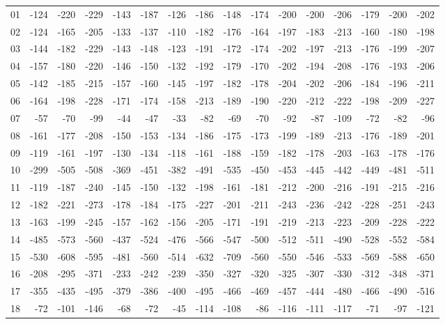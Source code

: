 \begin{longtable}{lrrrrrrrrrrrrrrr}
01 & -124 & -220 & -229 & -143 & -187 & -126 & -186 & -148 & -174 & -200 & -200 & -206 & -179 & -200 & -202 \\
02 & -124 & -165 & -205 & -133 & -137 & -110 & -182 & -176 & -164 & -197 & -183 & -213 & -160 & -180 & -198 \\
03 & -144 & -182 & -229 & -143 & -148 & -123 & -191 & -172 & -174 & -202 & -197 & -213 & -176 & -199 & -207 \\
04 & -157 & -180 & -220 & -146 & -150 & -132 & -192 & -179 & -170 & -202 & -194 & -208 & -176 & -193 & -206 \\
05 & -142 & -185 & -215 & -157 & -160 & -145 & -197 & -182 & -178 & -204 & -202 & -206 & -184 & -196 & -211 \\
06 & -164 & -198 & -228 & -171 & -174 & -158 & -213 & -189 & -190 & -220 & -212 & -222 & -198 & -209 & -227 \\
07 & -57 & -70 & -99 & -44 & -47 & -33 & -82 & -69 & -70 & -92 & -87 & -109 & -72 & -82 & -96 \\
08 & -161 & -177 & -208 & -150 & -153 & -134 & -186 & -175 & -173 & -199 & -189 & -213 & -176 & -189 & -201 \\
09 & -119 & -161 & -197 & -130 & -134 & -118 & -161 & -188 & -159 & -182 & -178 & -203 & -163 & -178 & -176 \\
10 & -299 & -505 & -508 & -369 & -451 & -382 & -491 & -535 & -450 & -453 & -445 & -442 & -449 & -481 & -511 \\
11 & -119 & -187 & -240 & -145 & -150 & -132 & -198 & -161 & -181 & -212 & -200 & -216 & -191 & -215 & -216 \\
12 & -182 & -221 & -273 & -178 & -184 & -175 & -227 & -201 & -211 & -243 & -236 & -242 & -228 & -251 & -243 \\
13 & -163 & -199 & -245 & -157 & -162 & -156 & -205 & -171 & -191 & -219 & -213 & -223 & -209 & -228 & -222 \\
14 & -485 & -573 & -560 & -437 & -524 & -476 & -566 & -547 & -500 & -512 & -511 & -490 & -528 & -552 & -584 \\
15 & -530 & -608 & -595 & -481 & -560 & -514 & -632 & -709 & -560 & -550 & -546 & -533 & -569 & -588 & -650 \\
16 & -208 & -295 & -371 & -233 & -242 & -239 & -350 & -327 & -320 & -325 & -307 & -330 & -312 & -348 & -371 \\
17 & -355 & -435 & -495 & -379 & -386 & -400 & -495 & -466 & -469 & -457 & -444 & -480 & -466 & -490 & -516 \\
18 & -72 & -101 & -146 & -68 & -72 & -45 & -114 & -108 & -86 & -116 & -111 & -117 & -71 & -97 & -121 \\

\end{longtable}
